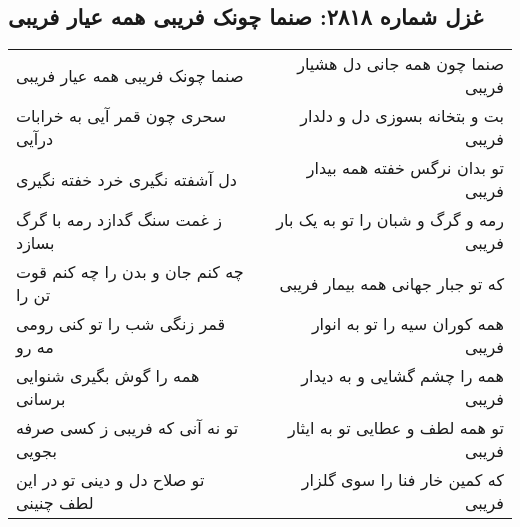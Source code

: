\begin{center}
\section*{غزل شماره ۲۸۱۸: صنما چونک فریبی همه عیار فریبی}
\label{sec:2818}
\begin{longtable}{l p{0.5cm} r}
صنما چونک فریبی همه عیار فریبی
&&
صنما چون همه جانی دل هشیار فریبی
\\
سحری چون قمر آیی به خرابات درآیی
&&
بت و بتخانه بسوزی دل و دلدار فریبی
\\
دل آشفته نگیری خرد خفته نگیری
&&
تو بدان نرگس خفته همه بیدار فریبی
\\
ز غمت سنگ گدازد رمه با گرگ بسازد
&&
رمه و گرگ و شبان را تو به یک بار فریبی
\\
چه کنم جان و بدن را چه کنم قوت تن را
&&
که تو جبار جهانی همه بیمار فریبی
\\
قمر زنگی شب را تو کنی رومی مه رو
&&
همه کوران سیه را تو به انوار فریبی
\\
همه را گوش بگیری شنوایی برسانی
&&
همه را چشم گشایی و به دیدار فریبی
\\
تو نه آنی که فریبی ز کسی صرفه بجویی
&&
تو همه لطف و عطایی تو به ایثار فریبی
\\
تو صلاح دل و دینی تو در این لطف چنینی
&&
که کمین خار فنا را سوی گلزار فریبی
\\
\end{longtable}
\end{center}
